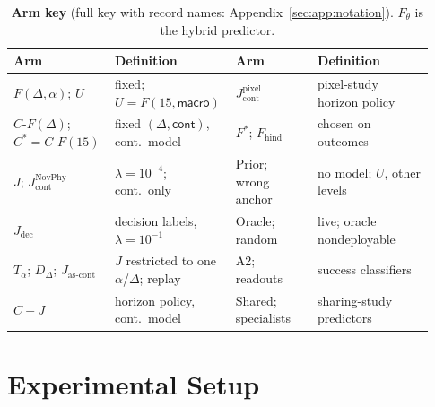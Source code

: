 \begin{table}[t]
\ifshowrevisions\color{blue}\fi
\centering
\footnotesize
\caption{\textbf{Arm key} (full key with record names: Appendix~\ref{sec:app:notation}). $F_\theta$ is the hybrid predictor.}
\label{tab:setup:arms}
\setlength{\tabcolsep}{3pt}
\begin{tabular}{@{}>{\raggedright\arraybackslash}p{0.21\linewidth}>{\raggedright\arraybackslash}p{0.26\linewidth}>{\raggedright\arraybackslash}p{0.19\linewidth}>{\raggedright\arraybackslash}p{0.27\linewidth}@{}}
\toprule
Arm & Definition & Arm & Definition \\
\midrule
$F(\Delta,\alpha)$; $U$ & fixed; $U{=}F(15,\textsf{macro})$ & $J_{\mathrm{cont}}^{\mathrm{pixel}}$ & pixel-study horizon policy \\
$C\text{-}F(\Delta)$; $C^*{=}C\text{-}F(15)$ & fixed $(\Delta,\textsf{cont})$, cont.\ model & $F^*$; $F_{\mathrm{hind}}$ & chosen on outcomes \\
$J$; $J_{\mathrm{cont}}^{\mathrm{NovPhy}}$ & $\lambda{=}10^{-4}$; cont.\ only & Prior; wrong anchor & no model; $U$, other levels \\
$J_{\mathrm{dec}}$ & decision labels, $\lambda{=}10^{-1}$ & Oracle; random & live; oracle nondeployable \\
$T_\alpha$; $D_\Delta$; $J_{\text{as-cont}}$ & $J$ restricted to one $\alpha$/$\Delta$; replay & A2; readouts & success classifiers \\
$C\!-\!J$ & horizon policy, cont.\ model & Shared; specialists & sharing-study predictors \\
\bottomrule
\end{tabular}
\end{table}

\section{Experimental Setup}
\label{sec:mth:protocol}

